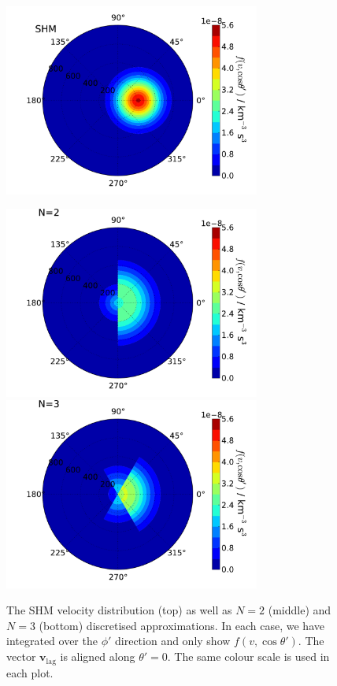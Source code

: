 \begin{figure}[pht!]
  \centering
  \includegraphics[width=0.75\textwidth]{Directional/SHMpolar.pdf}

  \includegraphics[width=0.75\textwidth]{Directional/SHMpolarN2.pdf}
  \includegraphics[width=0.75\textwidth]{Directional/SHMpolarN3.pdf}

\caption[Examples of discretised velocity distributions]{The SHM velocity distribution (top) as well as $N=2$ (middle) and $N=3$ (bottom) discretised approximations. In each case, we have integrated over the $\phi'$ direction and only show $f(v, \cos\theta')$. The vector $\textbf{v}_\textrm{lag}$ is aligned along $\theta' = 0$. The same colour scale is used in each plot.}
  \label{fig:directional:Discrete}
\end{figure}

